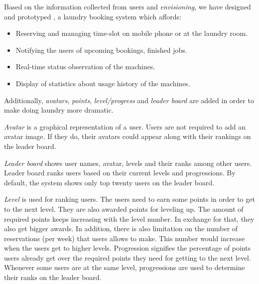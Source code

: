 Based on the information collected from users and \emph{envisioning}, we have designed and prototyped {\toolname}, a laundry booking system which affords:
\begin{itemize}
\item Reserving and managing time-slot on mobile phone or at the laundry room.
\item Notifying the users of upcoming bookings, finished jobs.
\item Real-time status observation of the machines.
\item Display of statistics about usage history of the machines.
\end{itemize}
Additionally, \emph{avatars}, \emph{points}, \emph{level/progress} and \emph{leader board} are added in order to make doing laundry more dramatic.

\emph{Avatar} is a graphical representation of a user. Users are not required to add an avatar image. If they do, their avatars could appear along with their rankings on the leader board. 

\emph{Leader board} shows user names, avatar, levels and their ranks among other users. Leader board ranks users based on their current levels and progressions. By default, the system shows only top twenty users on the leader board.

\emph{Level} is used for ranking users. The users need to earn some points in order to get to the next level. They are also awarded points for leveling up. The amount of required points keeps increasing with the level number. In exchange for that, they also get bigger awards. In addition, there is also limitation on the number of reservations (per week) that users allows to make. This number would increase when the users get to higher levels. Progression signifies the percentage of points users already get over the required points they need for getting to the next level. Whenever some users are at the same level, progressions are used to determine their ranks on the leader board.
 
